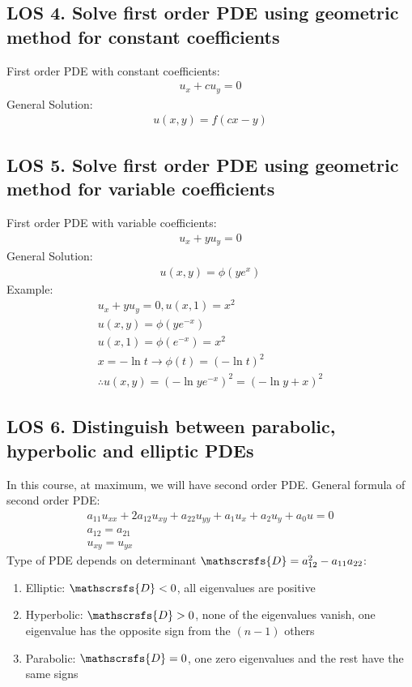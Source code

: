 \documentclass[12pt, a4paper]{article}
\begin{document}
\subsection*{LOS 4. Solve first order PDE using geometric method for constant coefficients}
First order PDE with constant coefficients:
\begin{gather*}
    u_{x} + cu_{y} = 0
\end{gather*}
General Solution:
\begin{gather*}
    u(x, y) = f(cx - y)
\end{gather*}
\vspace{0.3em}

\subsection*{LOS 5. Solve first order PDE using geometric method for variable coefficients}
First order PDE with variable coefficients:
\begin{gather*}
    u_{x} + yu_{y} = 0
\end{gather*}
General Solution:
\begin{gather*}
    u(x, y) = \phi(ye^x)
\end{gather*}
Example:
\begin{gather*}
    u_{x} + yu_{y} = 0, u(x, 1) = x^2 \\
    u(x, y) = \phi(ye^{-x}) \\ 
    u(x, 1) = \phi(e^{-x}) = x^2 \\
    x = -\ln t \rightarrow \phi(t) = (-\ln t)^2 \\ 
    \therefore u(x, y) = (-\ln ye^{-x})^2 = (-\ln y + x)^2
\end{gather*}
\vspace{0.3em}

\subsection*{LOS 6. Distinguish between parabolic, hyperbolic and elliptic PDEs}
In this course, at maximum, we will have second order PDE. General formula of second order PDE:
\begin{gather*}
    a_{11}u_{xx} + 2a_{12}u_{xy} + a_{22}u_{yy} + a_{1}u_{x} + a_{2}u_{y} + a_{0}u = 0 \\
    a_{12} = a_{21} \\
    u_{xy} = u_{yx}
\end{gather*}
Type of PDE depends on determinant $\mathscrsfs{D} = a_{12}^2 - a_{11}a_{22}$:
\begin{enumerate}
    \item Elliptic: $\mathscrsfs{D} < 0$, all eigenvalues are positive
    \item Hyperbolic: $\mathscrsfs{D} > 0$, none of the eigenvalues vanish, one eigenvalue has the opposite sign from the $(n-1)$ others
    \item Parabolic: $\mathscrsfs{D} = 0$, one zero eigenvalues and the rest have the same signs
\end{enumerate}
\vspace{0.3em}
\end{document}
